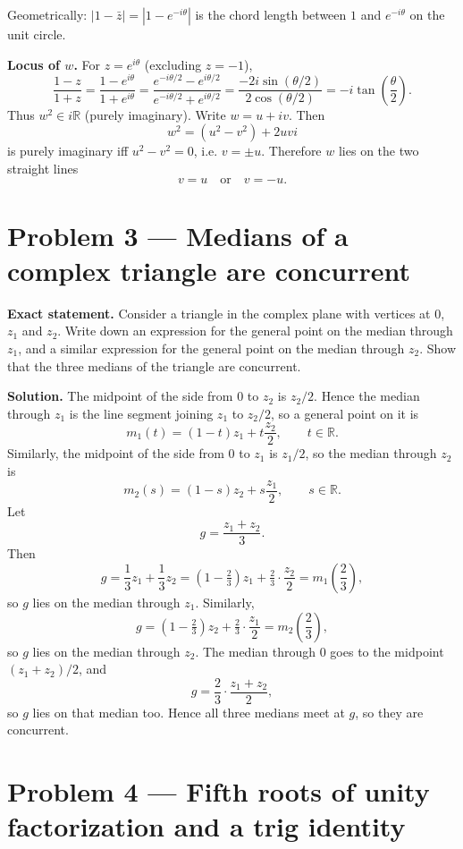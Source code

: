 \documentclass[12pt,a4paper]{article}
\theoremstyle{plain}
\theoremstyle{definition}      %
\begin{document}
Geometrically: \(|1-\bar z|=|1-e^{-i\theta}|\) is the chord length between \(1\) and \(e^{-i\theta}\) on the unit circle.

\medskip
\noindent\textbf{Locus of \(w\).}
For \(z=e^{i\theta}\) (excluding \(z=-1\)),
\[
\frac{1-z}{1+z}
=\frac{1-e^{i\theta}}{1+e^{i\theta}}
=\frac{e^{-i\theta/2}-e^{i\theta/2}}{e^{-i\theta/2}+e^{i\theta/2}}
=\frac{-2i\sin(\theta/2)}{2\cos(\theta/2)}
=-i\tan\!\left(\frac\theta2\right).
\]
Thus \(w^2\in i\mathbb{R}\) (purely imaginary). Write \(w=u+iv\). Then
\[
w^2=(u^2-v^2)+2uvi
\]
is purely imaginary iff \(u^2-v^2=0\), i.e. \(v=\pm u\). Therefore \(w\) lies on the two straight lines
\[
v=u \quad\text{or}\quad v=-u.
\]


\section*{Problem 3 — Medians of a complex triangle are concurrent}

\textbf{Exact statement.}
Consider a triangle in the complex plane with vertices at \(0\), \(z_1\) and \(z_2\). Write down an expression for the
general point on the median through \(z_1\), and a similar expression for the general point on the median through \(z_2\).
Show that the three medians of the triangle are concurrent.

\textbf{Solution.}
The midpoint of the side from \(0\) to \(z_2\) is \(z_2/2\). Hence the median through \(z_1\) is the line segment joining
\(z_1\) to \(z_2/2\), so a general point on it is
\[
m_1(t)=(1-t)z_1+t\frac{z_2}{2},\qquad t\in\mathbb{R}.
\]
Similarly, the midpoint of the side from \(0\) to \(z_1\) is \(z_1/2\), so the median through \(z_2\) is
\[
m_2(s)=(1-s)z_2+s\frac{z_1}{2},\qquad s\in\mathbb{R}.
\]
Let
\[
g=\frac{z_1+z_2}{3}.
\]
Then
\[
g=\frac13 z_1+\frac13 z_2=(1-\tfrac23)z_1+\tfrac23\cdot\frac{z_2}{2}=m_1\!\left(\frac23\right),
\]
so \(g\) lies on the median through \(z_1\). Similarly,
\[
g=(1-\tfrac23)z_2+\tfrac23\cdot\frac{z_1}{2}=m_2\!\left(\frac23\right),
\]
so \(g\) lies on the median through \(z_2\). The median through \(0\) goes to the midpoint \((z_1+z_2)/2\), and
\[
g=\frac{2}{3}\cdot \frac{z_1+z_2}{2},
\]
so \(g\) lies on that median too. Hence all three medians meet at \(g\), so they are concurrent.


\section*{Problem 4 — Fifth roots of unity factorization and a trig identity}
\end{document}
